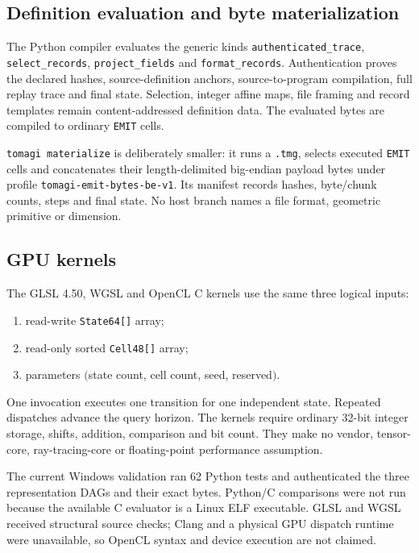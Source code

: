 \documentclass[11pt,a4paper]{article}
\newcommand{\code}[1]{\texttt{#1}}
\begin{document}
\subsection{Definition evaluation and byte materialization}
The Python compiler evaluates the generic kinds \code{authenticated\_trace}, \code{select\_records}, \code{project\_fields} and \code{format\_records}. Authentication proves the declared hashes, source-definition anchors, source-to-program compilation, full replay trace and final state. Selection, integer affine maps, file framing and record templates remain content-addressed definition data. The evaluated bytes are compiled to ordinary \code{EMIT} cells.

\code{tomagi materialize} is deliberately smaller: it runs a \code{.tmg}, selects executed \code{EMIT} cells and concatenates their length-delimited big-endian payload bytes under profile \code{tomagi-emit-bytes-be-v1}. Its manifest records hashes, byte/chunk counts, steps and final state. No host branch names a file format, geometric primitive or dimension.

\subsection{GPU kernels}
The GLSL 4.50, WGSL and OpenCL C kernels use the same three logical inputs:
\begin{enumerate}
\item read-write \code{State64[]} array;
\item read-only sorted \code{Cell48[]} array;
\item parameters $($state count, cell count, seed, reserved$)$.
\end{enumerate}
One invocation executes one transition for one independent state. Repeated dispatches advance the query horizon. The kernels require ordinary 32-bit integer storage, shifts, addition, comparison and bit count. They make no vendor, tensor-core, ray-tracing-core or floating-point performance assumption.

\begin{evidencebox}
The current Windows validation ran 62 Python tests and authenticated the three representation DAGs and their exact bytes. Python/C comparisons were not run because the available C evaluator is a Linux ELF executable. GLSL and WGSL received structural source checks; Clang and a physical GPU dispatch runtime were unavailable, so OpenCL syntax and device execution are not claimed.
\end{evidencebox}
\end{document}
